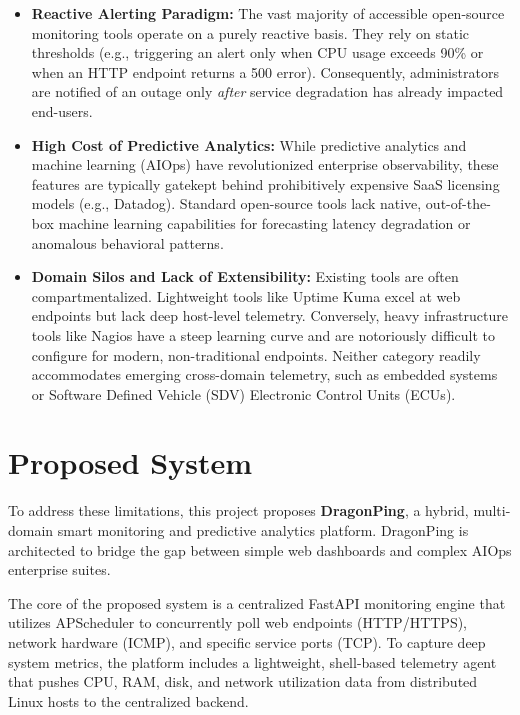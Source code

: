 \documentclass[12pt,a4paper,oneside]{report}
\begin{document}
\begin{itemize}[label=\textbullet, leftmargin=*]
    \item \textbf{Reactive Alerting Paradigm:} The vast majority of accessible open-source monitoring tools operate on a purely reactive basis. They rely on static thresholds (e.g., triggering an alert only when CPU usage exceeds 90\% or when an HTTP endpoint returns a 500 error). Consequently, administrators are notified of an outage only \textit{after} service degradation has already impacted end-users.
    
    \item \textbf{High Cost of Predictive Analytics:} While predictive analytics and machine learning (AIOps) have revolutionized enterprise observability, these features are typically gatekept behind prohibitively expensive SaaS licensing models (e.g., Datadog). Standard open-source tools lack native, out-of-the-box machine learning capabilities for forecasting latency degradation or anomalous behavioral patterns.
    
    \item \textbf{Domain Silos and Lack of Extensibility:} Existing tools are often compartmentalized. Lightweight tools like Uptime Kuma excel at web endpoints but lack deep host-level telemetry. Conversely, heavy infrastructure tools like Nagios have a steep learning curve and are notoriously difficult to configure for modern, non-traditional endpoints. Neither category readily accommodates emerging cross-domain telemetry, such as embedded systems or Software Defined Vehicle (SDV) Electronic Control Units (ECUs).
\end{itemize}

\section{Proposed System}
\noindent To address these limitations, this project proposes \textbf{DragonPing}, a hybrid, multi-domain smart monitoring and predictive analytics platform. DragonPing is architected to bridge the gap between simple web dashboards and complex AIOps enterprise suites. 

\noindent The core of the proposed system is a centralized FastAPI monitoring engine that utilizes APScheduler to concurrently poll web endpoints (HTTP/HTTPS), network hardware (ICMP), and specific service ports (TCP). To capture deep system metrics, the platform includes a lightweight, shell-based telemetry agent that pushes CPU, RAM, disk, and network utilization data from distributed Linux hosts to the centralized backend.
\end{document}
